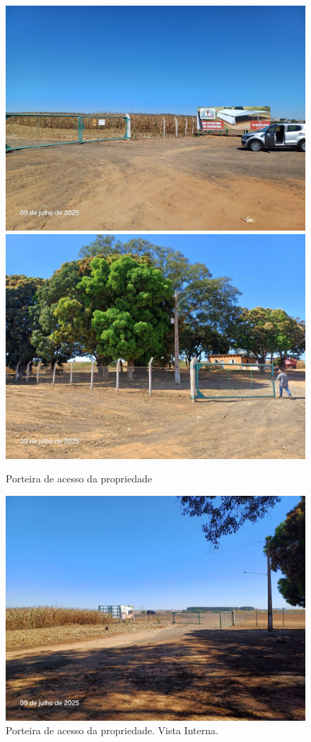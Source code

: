 \documentclass[
  10pt,
  a4paper]{article}
\begin{document}
\begin{figure}[H]

{\centering \includegraphics[width=0.49\linewidth]{./refs/Fotos/39} \includegraphics[width=0.49\linewidth]{./refs/Fotos/37} 

}

\caption{Porteira de acesso da propriedade}\label{fig:Porteira1}
\end{figure}

\begin{figure}[H]

{\centering \includegraphics[width=0.7\linewidth]{./refs/Fotos/34} 

}

\caption{Porteira de acesso da propriedade. Vista Interna.}\label{fig:Porteira2}
\end{figure}
\end{document}
